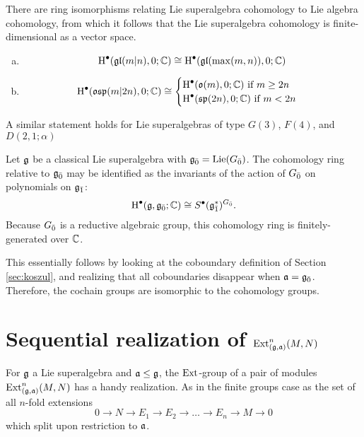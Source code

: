 \begin{theorem}
There are ring isomorphisms relating Lie superalgebra cohomology to Lie algebra cohomology, from which it follows that the Lie superalgebra cohomology is finite-dimensional as a vector space.
  \begin{enumerate}[(a)]
  \item \[\operatorname{H}^\bullet(\mathfrak{gl}(m|n),0;\mathbb{C}) \cong \operatorname{H}^\bullet(\mathfrak{gl}(\max(m,n)),0;\mathbb{C})\]
  \item \[
            \operatorname{H}^\bullet(\mathfrak{osp}(m|2n),0;\mathbb{C}) \cong
      \begin{cases}
        \operatorname{H}^\bullet(\mathfrak{o}(m),0;\mathbb{C}) \text{ if } m \geq 2n \\
        \operatorname{H}^\bullet(\mathfrak{sp}(2n),0;\mathbb{C}) \text{ if } m < 2n
\end{cases}
    \]
  \end{enumerate}
   A similar statement holds for Lie superalgebras of type $G(3)$, $F(4)$, and $D(2,1;\alpha)$
\end{theorem}

\begin{theorem} \label{thm:bkn}
  Let $\mathfrak{g}$ be a classical Lie superalgebra with ${\mathfrak{g}}_{\bar{0}} = \operatorname{Lie}({G}_{\bar{0}})$. The cohomology ring relative to ${\mathfrak{g}}_{\bar{0}}$ may be identified as the invariants of the action of ${G}_{\bar{0}}$ on polynomials on ${\mathfrak{g}}_{\bar{1}}$:
  \begin{equation}
    \label{eq:bkn-thm}
    \operatorname{H}^\bullet(\mathfrak{g},{\mathfrak{g}}_{\bar{0}};\mathbb{C}) \cong S^\bullet({\mathfrak{g}}_{\bar{1}}^*)^{{G}_{\bar{0}}}.
  \end{equation}
  Because ${G}_{\bar{0}}$ is a reductive algebraic group, this cohomology ring is finitely-generated over $\mathbb{C}$.
\end{theorem}

This essentially follows by looking at the coboundary definition of Section \ref{sec:koszul}, and realizing that all coboundaries disappear when $\mathfrak{a} = {\mathfrak{g}}_{\bar{0}}$. Therefore, the cochain groups are isomorphic to the cohomology groups.

\section{Sequential realization of $\operatorname{Ext}_{(\mathfrak{g},\mathfrak{a})}^n(M,N)$}
\label{sec:ext-realization}

For $\mathfrak{g}$ a Lie superalgebra and $\mathfrak{a} \leq \mathfrak{g}$, the $\operatorname{Ext}$-group of a pair of modules $\operatorname{Ext}_{(\mathfrak{g},\mathfrak{a})}^n(M,N)$ has a handy realization. As in the finite groups case  as the set of all $n$-fold extensions
\begin{equation}
  \label{eq:ext-seq}
  0 \to N \to E_1 \to E_2 \to \ldots \to E_n \to M \to 0
\end{equation}
which split upon restriction to $\mathfrak{a}$. 

